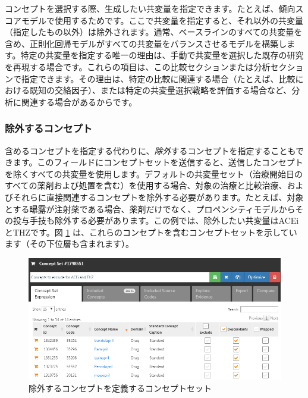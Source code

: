 \documentclass[
  11pt]{book}
\theoremstyle{definition}
\theoremstyle{definition}
\theoremstyle{definition}
\theoremstyle{definition}
\theoremstyle{remark}
\begin{document}
コンセプトを選択する際、生成したい共変量を指定できます。たとえば、傾向スコアモデルで使用するためです。ここで共変量を指定すると、それ以外の共変量（指定したもの以外）は除外されます。通常、ベースラインのすべての共変量を含め、正則化回帰モデルがすべての共変量をバランスさせるモデルを構築します。特定の共変量を指定する唯一の理由は、手動で共変量を選択した既存の研究を再現する場合です。これらの項目は、この比較セクションまたは分析セクションで指定できます。その理由は、特定の比較に関連する場合（たとえば、比較における既知の交絡因子）、または特定の共変量選択戦略を評価する場合など、分析に関連する場合があるからです。

\subsubsection*{除外するコンセプト}\label{ux9664ux5916ux3059ux308bux30b3ux30f3ux30bbux30d7ux30c8}

含めるコンセプトを指定する代わりに、\emph{除外}するコンセプトを指定することもできます。このフィールドにコンセプトセットを送信すると、送信したコンセプトを除くすべての共変量を使用します。デフォルトの共変量セット（治療開始日のすべての薬剤および処置を含む）を使用する場合、対象の治療と比較治療、およびそれらに直接関連するコンセプトを除外する必要があります。たとえば、対象とする曝露が注射薬である場合、薬剤だけでなく、プロペンシティモデルからその投与手技も除外する必要があります。この例では、除外したい共変量はACEiとTHZです。図 \ref{fig:covsToExclude} は、これらのコンセプトを含むコンセプトセットを示しています（その下位層も含まれます）。

\begin{figure}

{\centering \includegraphics[width=1\linewidth]{images/PopulationLevelEstimation/covsToExclude} 

}

\caption{除外するコンセプトを定義するコンセプトセット}\label{fig:covsToExclude}
\end{figure}
\end{document}

